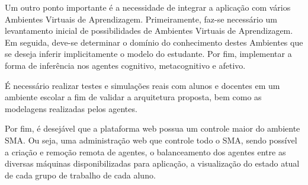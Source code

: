 Um outro ponto importante é a necessidade de integrar a aplicação com vários Ambientes Virtuais de Aprendizagem. Primeiramente, faz-se necessário um levantamento inicial de possibilidades de Ambientes Virtuais de Aprendizagem. Em seguida, deve-se determinar o domínio do conhecimento destes Ambientes que se deseja inferir implicitamente o modelo do estudante. Por fim, implementar a forma de inferência nos agentes cognitivo, metacognitivo e afetivo.

É necessário realizar testes e simulações reais com alunos e docentes em um ambiente escolar a fim de validar a arquitetura proposta, bem como as modelagens realizadas pelos agentes.

Por fim, é desejável que a plataforma web possua um controle maior do ambiente SMA. Ou seja, uma administração web que controle todo o SMA, sendo possível a criação e remoção remota de agentes, o balanceamento dos agentes entre as diversas máquinas disponibilizadas para aplicação, a visualização do estado atual de cada grupo de trabalho de cada aluno.
